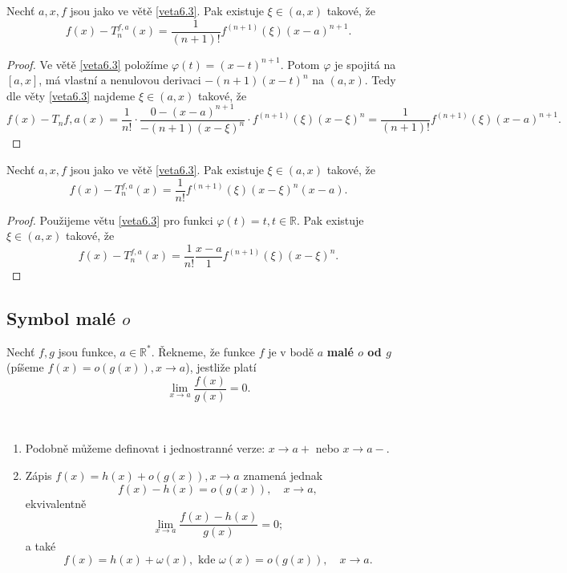 \begin{veta}\label{veta6.4}
Nechť $a,x,f$ jsou jako ve větě \ref{veta6.3}. Pak existuje $\xi \in (a,x)$ takové, že
\[
f(x) - T^{f,a}_n(x)
=
\frac{1}{(n+1)!}
f^{(n+1)}(\xi)(x-a)^{n+1}.
\]
\end{veta}

\begin{proof}
	Ve větě \ref{veta6.3} položíme $\varphi(t)=(x-t)^{n+1}$. Potom $\varphi$ je spojitá na $\left [ a,x \right ] $,
	má vlastní a nenulovou derivaci $-(n+1)(x-t)^n$ na $(a,x)$. Tedy dle věty \ref{veta6.3} najdeme $\xi \in (a,x)$
	takové, že
	$$
	    f(x)-T_n{f,a}(x)=\frac{1}{n!}\cdot \frac{0-(x-a)^{n+1}}{-(n+1)(x-\xi)^n}\cdot f^{(n+1)}(\xi)(x-\xi)^n = \frac{1}{(n+1)!}f^{(n+1)}(\xi)(x-a)^{n+1}.
	$$
\end{proof}

\begin{veta} \label{veta6.5}
Nechť $a,x,f$ jsou jako ve větě \ref{veta6.3}.  Pak existuje $\xi \in (a,x)$ takové, že
\[
f(x) - T^{f,a}_n(x)
=
\frac{1}{n!}
f^{(n+1)}(\xi)(x-\xi)^n (x-a).
\]
\end{veta}

\begin{proof}
	Použijeme větu \ref{veta6.3} pro funkci $\varphi(t)=t, t\in \mathbb R $. Pak existuje $\xi\in(a,x)$ takové,
	že
	$$
	    f(x)-T_n^{f,a}(x)=\frac{1}{n!}\frac{x-a}{1}f^{(n+1)}(\xi)(x-\xi)^n.
	$$
\end{proof}

\subsection[Symbol malé o]{Symbol malé $o$}
\begin{definice}
Nechť $f,g$ jsou funkce, $a \in \mathbb{R}^*$. Řekneme, že funkce $f$ je v bodě $a$
\textbf{malé $o$ od $g$} (píšeme $f(x) = o(g(x)), x \to a$), jestliže platí
\[
\lim_{x \to a} \frac{f(x)}{g(x)} = 0.
\]
\end{definice}

\begin{poznamka}\,
\begin{enumerate}[(1)]
	\item Podobně můžeme definovat i jednostranné verze:
	$x\to a+$ nebo $x\to a-$.
	\item Zápis $f(x)=h(x)+o(g(x)), x\to a$ znamená jednak
	$$
	    f(x)-h(x)=o(g(x)), \quad x\to a,
	$$
	ekvivalentně
	$$
	    \lim_{x\to a} \frac{f(x)-h(x)}{g(x)}=0;
	$$
	a také
	$$
	    f(x)=h(x)+\omega(x), \textrm{ kde } \omega(x) = o(g(x)), \quad x \to a.
	$$
\end{enumerate}
\end{poznamka}


